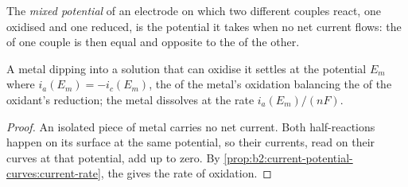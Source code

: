 \begin{definition}\label{def:b2:batteries-electrolysis:mixed-potential}
The \emph{mixed potential} of an electrode on which two
different couples react, one oxidised and one reduced, is the potential it
takes when no net current flows: the  of one couple is then
equal and opposite to the  of the other.
\end{definition}

\begin{proposition}\label{prop:b2:batteries-electrolysis:mixed}
A metal dipping into a solution that can oxidise it settles at the potential
$E_m$ where $i_a(E_m) = -i_c(E_m)$, the  of the metal's
oxidation balancing the  of the oxidant's reduction; the
metal dissolves at the rate $i_a(E_m)/(nF)$.
\end{proposition}

\begin{proof}
An isolated piece of metal carries no net current. Both half-reactions happen
on its surface at the same potential, so their currents, read on their curves
at that potential, add up to zero. By \cref{prop:b2:current-potential-curves:current-rate},
the  gives the rate of oxidation.
\end{proof}

